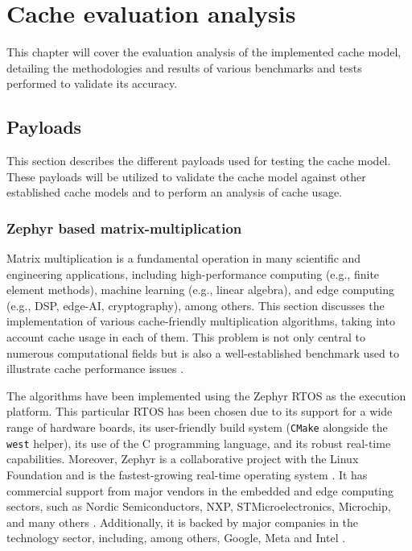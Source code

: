 
\chapter{Cache evaluation analysis}
This chapter will cover the evaluation analysis of the implemented cache model, detailing the methodologies and results of various benchmarks and tests performed to validate
its accuracy.

\section{Payloads}
This section describes the different payloads used for testing the cache model. These payloads will be utilized to validate the cache model against other established cache models
and to perform an analysis of cache usage.

\subsection{Zephyr based matrix-multiplication}

Matrix multiplication is a fundamental operation in many scientific and engineering applications, including high-performance computing (e.g., finite element methods), machine
learning (e.g., linear algebra), and edge computing (e.g., DSP, edge-AI, cryptography), among others. This section discusses the implementation of various cache-friendly
multiplication algorithms, taking into account cache usage in each of them. This problem is not only central to numerous computational fields but is also a well-established
benchmark used to illustrate cache performance issues \cite{whatevery, tcgcachemodelling, comparchaquant}.

The algorithms have been implemented using the Zephyr RTOS as the execution platform. This particular RTOS has been chosen due to its support for a wide range of hardware boards,
its user-friendly build system (\texttt{CMake} alongside the \texttt{west} helper), its use of the C programming language, and its robust real-time capabilities.
Moreover, Zephyr is a collaborative project with the Linux Foundation and is the fastest-growing real-time operating system \cite{zephyrlotsofcommits}. It has commercial support
from major vendors in the embedded and edge computing sectors, such as Nordic Semiconductors, NXP, STMicroelectronics, Microchip, and many others \cite{aboutzephyr}. Additionally,
it is backed by major companies in the technology sector, including, among others, Google, Meta and Intel \cite{zephyrmetagoogle, zephyrmembers}.

